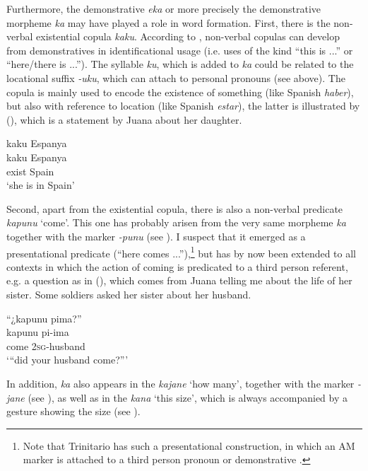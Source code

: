 Furthermore, the demonstrative \textit{eka} or more precisely the demonstrative  morpheme \textit{ka} may have played a role in word formation. First, there is the non-verbal existential copula \textit{kaku}. According to \citet[143]{Diessel1999}, non-verbal copulas can develop from demonstratives in identificational usage (i.e. uses of the kind “this is ...” or “here/there is ...”). The syllable \textit{ku}, which is added to \textit{ka} could be related to the locational suffix \textit{-uku}, which can attach to personal pronouns (see  above). The copula is mainly used to encode the existence of something (like Spanish \textit{haber}), but also with reference to location (like Spanish \textit{estar}), the latter is illustrated by (), which is a statement by Juana about her daughter.


\ea\label{ex:dem-kaku-1}
\begingl
\glpreamble kaku Espanya\\
\gla kaku Espanya\\
\glb exist Spain\\
\glft ‘she is in Spain’
\endgl
\trailingcitation{[jxx-p110923l-1.229]}
\xe
{}

Second, apart from the existential copula, there is also a non-verbal predicate \textit{kapunu} ‘come’. This one has probably arisen from the very same morpheme \textit{ka} together with the  marker \textit{-punu} (see ). I suspect that it emerged as a presentational predicate (“here comes ...”),\footnote{Note that Trinitario has such a presentational construction, in which an AM marker is attached to a third person pronoun or demonstrative \citep[cf.][68]{Rose2018a}.} but has by now been extended to all contexts in which the action of coming is predicated to a third person referent, e.g. a question as in (), which comes from Juana telling me about the life of her sister. Some soldiers asked her sister about her husband.

\ea\label{ex:dem-kapunu-1}
\begingl 
\glpreamble “¿kapunu pima?”\\
\gla kapunu pi-ima\\ 
\glb come 2\textsc{sg}-husband\\ 
\glft ‘“did your husband come?”’
\endgl
\trailingcitation{[jxx-p120430l-2.128]}
\xe
{}

In addition, \textit{ka} also appears in the  \textit{kajane} ‘how many’, together with the  marker \textit{-jane} (see ), as well as in the  \textit{kana} ‘this size’, which is always accompanied by a gesture showing the size (see ). 

